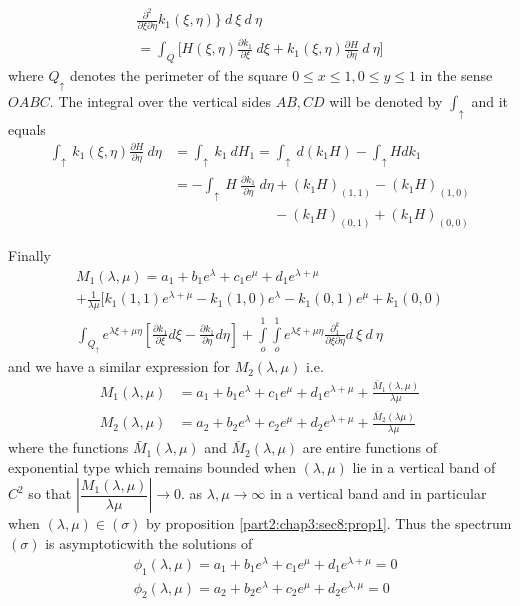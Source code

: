 \begin{proposition}
\begin{multline*}
  \frac{\partial^2}{\partial \xi \partial \eta} k_1 (\xi,\eta)\big\} ~
  d ~ \xi ~ d ~ \eta\\ 
   = \int_Q \Big[ H(\xi,\eta) \frac{\partial k_1}{\partial \xi} ~ d \xi +
    k_1 (\xi,\eta) \frac{\partial H}{\partial \eta} ~ d  ~ \eta 
    \Big]
  \end{multline*}
  where $Q_\uparrow$ denotes the perimeter of the square $0 \le x \le 1, 0 \le
  y \le 1$ in the sense $OABC$. The integral over the vertical sides
  $AB,CD$ will be denoted by $\int_\uparrow$ and it equals 
  \begin{align*}
    \int_\uparrow ~ k_1 (\xi, \eta) \frac{\partial H}{\partial
      \eta} ~ d \eta &= \int_\uparrow ~ k_1 ~dH_1
     = \int_\uparrow ~ d(k_1H) - \int_\uparrow Hdk_1\\
    & = -\int_\uparrow ~ H ~ \frac{\partial k_1}{\partial \eta} ~ d
    \eta + (k_1 H)_{(1,1)} - (k_1H)_{(1,0)}\\ 
    & \hspace{3cm} - (k_1 H)_{(0,1)} + (k_1 H)_{(0,0)} 
  \end{align*}
\end{proposition}

Finally\pageoriginale 
\begin{multline*}
M_1 (\lambda,\mu)  = a_1 + b_1 e^\lambda + c_1 e^\mu + d_1
e^{\lambda + \mu}\\ 
   + \frac{1}{\lambda \mu} \Big[ k_1 (1,1) e^{\lambda + \mu} - k_1
    (1,0) e^{\lambda} - k_1 (0,1) e^\mu + k_1 (0,0)\\ 
     \int_{Q_\uparrow} e^{\lambda \xi + \mu \eta} \left[\frac{\partial
        k_1}{\partial \xi} d \xi - \frac{\partial k_1}{\partial \eta}
      d\eta \right] + \int\limits_o^1 \int\limits_o^1 e^{\lambda \xi +
      \mu \eta} \frac{\partial^ k_1}{\partial \xi \partial \eta} d ~
    \xi ~ d ~ \eta 
\end{multline*}
and we have a similar expression for $M_2 (\lambda, \mu)$ i.e.
\begin{align*}
   M_1 (\lambda,\mu) &= a_1 + b_1 e^\lambda + c_1 e^\mu + d_1
  e^{\lambda + \mu} + \frac{\bar{M}_1 (\lambda,\mu)}{\lambda \mu}\\ 
  M_2 (\lambda,\mu) &= a_2 + b_2 e^\lambda + c_2 e^\mu + d_2 e^{\lambda
    + \mu} + \frac{\bar{M}_2 (\lambda \mu)}{\lambda\mu} 
\end{align*}
where the functions $\bar{M}_1 (\lambda, \mu)$ and $\bar{M}_2
(\lambda, \mu)$ are entire functions of exponential type which remains
bounded when $(\lambda,\mu)$ lie in a vertical band of $C^2$ so that
$| \dfrac{M_1 (\lambda,\mu)}{\lambda \mu}| \rightarrow 0$. as
$\lambda, \mu \rightarrow \infty$ in a vertical band and in particular
when $(\lambda, \mu) \in (\sigma)$ by proposition
\ref{part2:chap3:sec8:prop1}. Thus the 
spectrum $(\sigma)$ is asymptotic\pageoriginale with the solutions of  
\begin{align*}
  & \phi_1 (\lambda, \mu) = a_1 + b_1 e^\lambda + c_1 e^\mu + d_1
  e^{\lambda + \mu } = 0\\ 
  & \phi_2(\lambda,\mu) = a_2 + b_2 e^\lambda + c_2 e^\mu + d_2
  e^{\lambda, \mu} = 0 
\end{align*}

